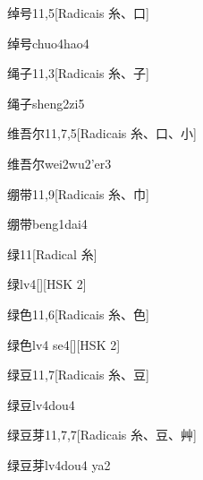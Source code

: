 \begin{entry}{绰号}{11,5}[Radicais ⽷、⼝]
  \begin{phonetics}{绰号}{chuo4hao4}
  \end{phonetics}
\end{entry}

\begin{entry}{绳子}{11,3}[Radicais ⽷、⼦]
  \begin{phonetics}{绳子}{sheng2zi5}
  \end{phonetics}
\end{entry}

\begin{entry}{维吾尔}{11,7,5}[Radicais ⽷、⼝、⼩]
  \begin{phonetics}{维吾尔}{wei2wu2'er3}
  \end{phonetics}
\end{entry}

\begin{entry}{绷带}{11,9}[Radicais ⽷、⼱]
  \begin{phonetics}{绷带}{beng1dai4}
  \end{phonetics}
\end{entry}

\begin{entry}{绿}{11}[Radical ⽷]
  \begin{phonetics}{绿}{lv4}[][HSK 2]
  \end{phonetics}
\end{entry}

\begin{entry}{绿色}{11,6}[Radicais ⽷、⾊]
  \begin{phonetics}{绿色}{lv4 se4}[][HSK 2]
  \end{phonetics}
\end{entry}

\begin{entry}{绿豆}{11,7}[Radicais ⽷、⾖]
  \begin{phonetics}{绿豆}{lv4dou4}
  \end{phonetics}
\end{entry}

\begin{entry}{绿豆芽}{11,7,7}[Radicais ⽷、⾖、⾋]
  \begin{phonetics}{绿豆芽}{lv4dou4 ya2}
  \end{phonetics}
\end{entry}

